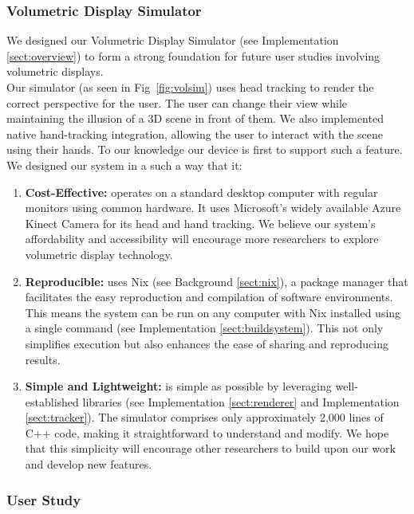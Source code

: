 \subsubsection{Volumetric Display Simulator}
We designed our Volumetric Display Simulator (see Implementation \ref{sect:overview}) to form a strong foundation for future user studies involving volumetric displays. \\

Our simulator (as seen in Fig~\ref{fig:volsim}) uses head tracking to render the correct perspective for the user. The user can change their view while maintaining the illusion of a 3D scene in front of them. We also implemented native hand-tracking integration, allowing the user to interact with the scene using their hands. To our knowledge our device is first to support such a feature. \\

We designed our system in a such a way that it: 

\begin{enumerate}
    \item \textbf{Cost-Effective:} operates on a standard desktop computer with regular monitors using common hardware. It uses Microsoft's widely available Azure Kinect Camera for its head and hand tracking. We believe our system's affordability and accessibility will encourage more researchers to explore volumetric display technology.

    \item \textbf{Reproducible:} uses Nix (see Background \ref{sect:nix}), a package manager that facilitates the easy reproduction and compilation of software environments. This means the system can be run on any computer with Nix installed using a single command (see Implementation \ref{sect:buildsystem}). This not only simplifies execution but also enhances the ease of sharing and reproducing results.

    \item \textbf{Simple and Lightweight:} is simple as possible by leveraging well-established libraries (see Implementation \ref{sect:renderer} and Implementation \ref{sect:tracker}). The simulator comprises only approximately 2,000 lines of C++ code, making it straightforward to understand and modify. We hope that this simplicity will encourage other researchers to build upon our work and develop new features.
\end{enumerate}

\subsubsection{User Study}

